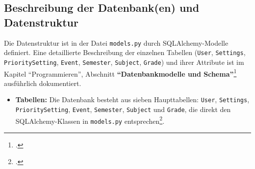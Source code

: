 \documentclass[12pt,a4paper]{report}
\begin{document}
\subsection{Beschreibung der Datenbank(en) und Datenstruktur}
Die Datenstruktur ist in der Datei \texttt{models.py} durch SQLAlchemy-Modelle definiert. Eine detaillierte Beschreibung der einzelnen Tabellen (\texttt{User}, \texttt{Settings}, \texttt{PrioritySetting}, \texttt{Event}, \texttt{Semester}, \texttt{Subject}, \texttt{Grade}) und ihrer Attribute ist im Kapitel \enquote{Programmieren}, Abschnitt \textbf{\enquote{Datenbankmodelle und Schema}}\footcite{main.tex} ausführlich dokumentiert.

\begin{itemize}
    \item \textbf{Tabellen:}
    Die Datenbank besteht aus sieben Haupttabellen: \texttt{User}, \texttt{Settings}, \texttt{PrioritySetting}, \texttt{Event}, \texttt{Semester}, \texttt{Subject} und \texttt{Grade}, die direkt den SQLAlchemy-Klassen in \texttt{models.py} entsprechen\footcite{app.py, main.tex}.


\end{itemize}
\end{document}
